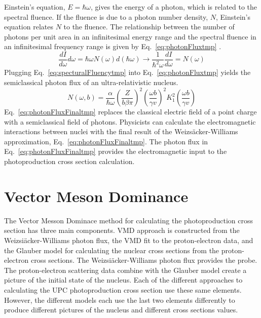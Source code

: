     Einstein's equation, $E=\hbar\omega$, gives the energy of a photon, which
      is related to the spectral fluence. 
    If the fluence is due to a photon number density, $N$, Einstein's equation
      relates $N$ to the fluence. 
    The relationship between the number of photons per unit area in an 
      infinitesimal energy range and the spectral fluence in an infinitesimal 
      frequency range is given by Eq.~\ref{eq:photonFluxtmp} \cite{WWJackson}.
    \begin{equation}  \label{eq:photonFluxtmp}
        \frac{dI}{d\omega}d\omega=\hbar\omega N(\omega)d(\hbar\omega)
         \rightarrow \frac{1}{\hbar^{2}\omega}\frac{dI}{d\omega}=N(\omega)
    \end{equation}
    Plugging Eq.~\ref{eq:specturalFluencytmp} into 
      Eq.~\ref{eq:photonFluxtmp} yields the semiclassical photon flux of an 
      ultra-relativistic nucleus.
    \begin{equation} \label{eq:photonFluxFinaltmp}
      N(\omega,b)=\frac{\alpha}{\hbar\omega}
       \left(\frac{Z}{b\beta\pi}\right)^{2}
       \left(\frac{\omega b}{\gamma v}\right)^{2}
       K_{1}^{2}\left(\frac{\omega b}{\gamma v}\right)
    \end{equation}
    Eq.~\ref{eq:photonFluxFinaltmp} replaces the classical electric field of a 
      point charge with a semiclassical field of photons. 
    Physicists can calculate the electromagnetic interactions between nuclei 
      with the final result of the Weizs\"{a}cker-Williams approximation, 
      Eq.~\ref{eq:photonFluxFinaltmp}.
    The photon flux in Eq.~\ref{eq:photonFluxFinaltmp} provides the 
      electromagnetic input to the \JPsi{} photoproduction cross section 
      calculation. 

  \section{\label{sec:vdmTheory}Vector Meson Dominance}
    The Vector Messon Dominace method for calculating the \JPsi{}
      photoproduction cross section has three main components.
    VMD approach is constructed from the Weizsi\"{a}cker-Williams photon
      flux, the VMD fit to the proton-electron data, and the Glauber model for 
      calculating the nuclear cross sections from the proton-electron cross 
      sections.
    The Weizsi\"{a}cker-Williams photon flux provides the probe. 
    The proton-electron scattering data combine with the Glauber model  
      create a picture of the initial state of the nucleus. 
    Each of the different approaches to calculating the UPC \JPsi{} 
      photoproduction cross section use these same elements.
    However, the different models each use the last two elements differently 
      to produce different pictures of the nucleus and different cross 
      sections values. 

